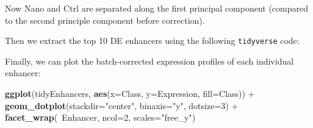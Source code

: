 \documentclass[9pt,a4paper,]{extarticle}
\newenvironment{Shaded}{\begin{snugshade}}{\end{snugshade}}
\newcommand{\KeywordTok}[1]{\textcolor[rgb]{0.13,0.29,0.53}{\textbf{{#1}}}}
\newcommand{\DataTypeTok}[1]{\textcolor[rgb]{0.13,0.29,0.53}{{#1}}}
\newcommand{\DecValTok}[1]{\textcolor[rgb]{0.00,0.00,0.81}{{#1}}}
\newcommand{\FloatTok}[1]{\textcolor[rgb]{0.00,0.00,0.81}{{#1}}}
\newcommand{\StringTok}[1]{\textcolor[rgb]{0.31,0.60,0.02}{{#1}}}
\newcommand{\CommentTok}[1]{\textcolor[rgb]{0.56,0.35,0.01}{\textit{{#1}}}}
\newcommand{\OtherTok}[1]{\textcolor[rgb]{0.56,0.35,0.01}{{#1}}}
\newcommand{\NormalTok}[1]{{#1}}
\begin{document}
Now Nano and Ctrl are separated along the first principal component (compared to the second principle component before correction).

Then we extract the top 10 DE enhancers using the following \texttt{tidyverse} code:

\begin{Shaded}
\end{Shaded}

Finally, we can plot the batch-corrected expression profiles of each individual enhancer:

\begin{Shaded}
\begin{Highlighting}[]
\KeywordTok{ggplot}\NormalTok{(tidyEnhancers, }\KeywordTok{aes}\NormalTok{(}\DataTypeTok{x=}\NormalTok{Class, }\DataTypeTok{y=}\NormalTok{Expression, }\DataTypeTok{fill=}\NormalTok{Class)) +}
\StringTok{    }\KeywordTok{geom_dotplot}\NormalTok{(}\DataTypeTok{stackdir=}\StringTok{"center"}\NormalTok{, }\DataTypeTok{binaxis=}\StringTok{"y"}\NormalTok{, }\DataTypeTok{dotsize=}\DecValTok{3}\NormalTok{) +}
\StringTok{    }\KeywordTok{facet_wrap}\NormalTok{(~Enhancer, }\DataTypeTok{ncol=}\DecValTok{2}\NormalTok{, }\DataTypeTok{scales=}\StringTok{"free_y"}\NormalTok{)}
\end{Highlighting}
\end{Shaded}
\end{document}
